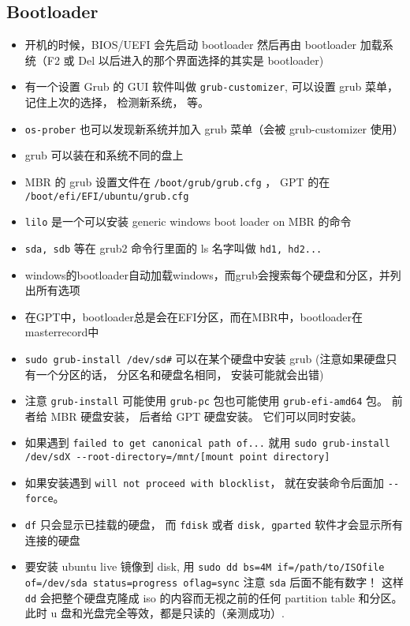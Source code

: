 \subsection{Bootloader}
\begin{itemize}
\item 开机的时候，BIOS/UEFI 会先启动 bootloader 然后再由 bootloader 加载系统（F2 或 Del 以后进入的那个界面选择的其实是 bootloader)
\item 有一个设置 Grub 的 GUI 软件叫做 \verb`grub-customizer`, 可以设置 grub 菜单， 记住上次的选择， 检测新系统， 等。
\item \verb`os-prober` 也可以发现新系统并加入 grub 菜单（会被 grub-customizer 使用）
\item grub 可以装在和系统不同的盘上
\item MBR 的 grub 设置文件在 \verb`/boot/grub/grub.cfg` ， GPT 的在 \verb`/boot/efi/EFI/ubuntu/grub.cfg`
\item \verb`lilo` 是一个可以安装 generic windows boot loader on MBR 的命令
\item \verb`sda, sdb` 等在 grub2 命令行里面的 ls 名字叫做 \verb`hd1, hd2...`
\item windows的bootloader自动加载windows，而grub会搜索每个硬盘和分区，并列出所有选项
\item 在GPT中，bootloader总是会在EFI分区，而在MBR中，bootloader在masterrecord中
\item \verb`sudo grub-install /dev/sd#` 可以在某个硬盘中安装 grub (注意如果硬盘只有一个分区的话， 分区名和硬盘名相同， 安装可能就会出错)
\item 注意 \verb`grub-install` 可能使用 \verb`grub-pc` 包也可能使用 \verb`grub-efi-amd64` 包。 前者给 MBR 硬盘安装， 后者给 GPT 硬盘安装。 它们可以同时安装。
\item 如果遇到 \verb`failed to get canonical path of...` 就用 \verb`sudo grub-install /dev/sdX --root-directory=/mnt/[mount point directory]`
\item 如果安装遇到 \verb`will not proceed with blocklist`， 就在安装命令后面加 \verb`--force`。
\item \verb`df` 只会显示已挂载的硬盘， 而 \verb`fdisk` 或者 \verb`disk, gparted` 软件才会显示所有连接的硬盘
\item 要安装 ubuntu live 镜像到 disk, 用 \verb`sudo dd bs=4M if=/path/to/ISOfile of=/dev/sda status=progress oflag=sync` 注意 \verb`sda` 后面不能有数字！ 这样 \verb`dd` 会把整个硬盘克隆成 iso 的内容而无视之前的任何 partition table 和分区。 此时 u 盘和光盘完全等效，都是只读的（亲测成功）.
\end{itemize}

